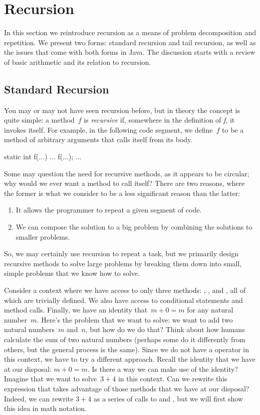 \section{Recursion}

In this section we reintroduce recursion as a means of problem decomposition and repetition. 
We present two forms: standard recursion and tail recursion, as well as the issues that come with both forms in Java. 
The discussion starts with a review of basic arithmetic and its relation to recursion.

\subsection{Standard Recursion}
You may or may not have seen recursion before, but in theory the concept is quite simple: a method~$f$ is \emph{recursive} if, somewhere in the definition of \emph{f}, it invokes itself. 
For example, in the following code segment, we define~$f$ to be a method of arbitrary arguments that calls itself from its body. 

\begin{verbnobox}[\small]
static int f(...) {
  ...
  f(...);
  ...
}
\end{verbnobox}

Some may question the need for recursive methods, as it appears to be circular; why would we ever want a method to call itself? 
There are two reasons, where the former is what we consider to be a less significant reason than the latter:

\begin{enumerate}
    \item It allows the programmer to repeat a given segment of code.
    \item We can compose the solution to a big problem by combining the solutions to smaller problems.
\end{enumerate}

So, we may certainly use recursion to repeat a task, but we primarily design recursive methods to solve large problems by breaking them down into small, simple problems that we know how to solve.

Consider a context where we have access to only three methods: , , and , all of which are trivially defined. 
We also have access to conditional statements and method calls. 
Finally, we have an identity that~$m + 0 = m$ for any natural number~$m$. 
Here's the problem that we want to solve: we want to add two natural numbers~$m$ and~$n$, but how do we do that? 
Think about how humans calculate the sum of two natural numbers (perhaps some do it differently from others, but the general process is the same). 
Since we do not have a \ttt{+} operator in this context, we have to try a different approach. 
Recall the identity that we have at our disposal: $m + 0 = m$. 
Is there a way we can make use of the identity? 
Imagine that we want to solve~$3 + 4$ in this context. 
Can we rewrite this expression that takes advantage of those methods that we have at our disposal? 
Indeed, we can rewrite $3+4$ as a series of calls to  and , but we will first show this idea in math notation.

